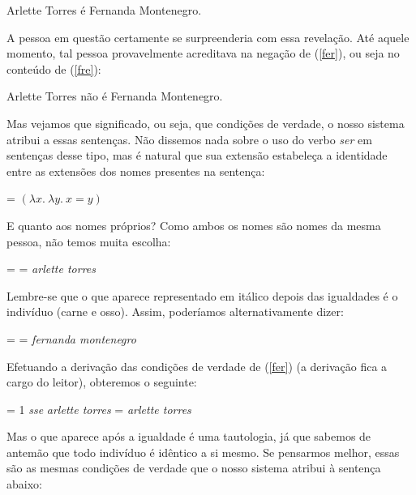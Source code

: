 \begin{exe}
\ex Arlette Torres é Fernanda Montenegro.\label{fer}
\end{exe}

\n A pessoa em questão certamente se surpreenderia com essa
revelação. Até aquele momento, tal pessoa provavelmente acreditava
na negação de (\ref{fer}), ou seja no conteúdo de (\ref{fre}):

\begin{exe}
\ex Arlette Torres não é Fernanda Montenegro.\label{fre}
\end{exe}

Mas vejamos que significado, ou seja, que condições de verdade, o
nosso sistema atribui a essas sentenças. Não dissemos nada sobre o
uso do verbo \textit{ser} em sentenças desse tipo, mas é natural
que sua extensão estabeleça a identidade entre as extensões dos
nomes presentes na sentença:

\begin{exe}
	\ex {} = $(\lambda x.\ \lambda y.\ x = y)$
\end{exe}

\n E quanto aos nomes próprios? Como ambos os nomes são nomes da
mesma pessoa, não temos muita escolha:

\begin{exe}
	\ex {} =  = \textit{arlette torres}
\end{exe}

\n Lembre-se que o que aparece representado em itálico depois das igualdades é o indivíduo
(carne e osso). Assim, poderíamos alternativamente dizer:

\begin{exe}
	\ex {} =  = \textit{fernanda montenegro}
\end{exe}

\n Efetuando a derivação das condições de verdade de (\ref{fer})
(a derivação fica a cargo do leitor), obteremos o seguinte:

\begin{exe}
	\ex \den{(\ref{fer})} = 1 \textit{sse} \textit{arlette torres} = \textit{arlette torres}
\end{exe}

\n Mas o que aparece após a igualdade é uma tautologia, já que
sabemos de antemão que todo indivíduo é idêntico a si mesmo. Se
pensarmos melhor, essas são as mesmas condições de verdade que o
nosso sistema atribui à sentença abaixo:


